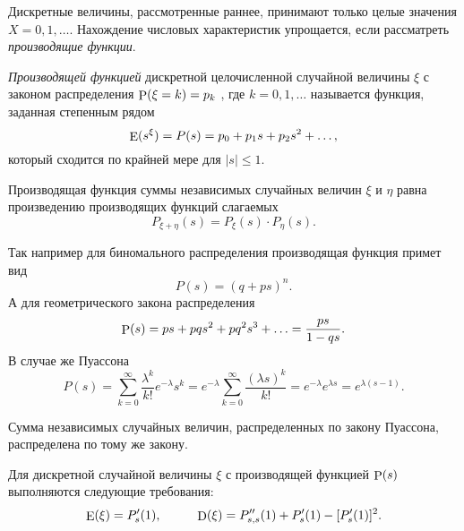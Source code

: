 Дискретные величины, рассмотренные раннее, принимают только целые значения $X = 0, 1, \ldots$. Нахождение числовых характеристик упрощается, если рассматреть \textit{производящие функции}.

\begin{to_def}
    \textit{Производящей функцией} дискретной целочисленной случайной величины $\xi$ с законом распределения
    $\P (\xi = k) = p_k$ , где $k = 0, 1, \ldots$ называется функция, заданная степенным рядом
    \begin{equation}
        \E(s^\xi) = P (s) = p_0 + p_1 s + p_2 s^2 + \ldots,
    \end{equation}
    который сходится по крайней мере для $|s| \leq 1$. 
\end{to_def}

\begin{to_thr}[]
    Производящая функция суммы независимых случайных величин $\xi$ и $\eta$ равна произведению производящих функций слагаемых
    \begin{equation}
        P_{\xi + \eta} (s) = P_\xi (s) \cdot P_\eta (s).
    \end{equation}
\end{to_thr}

Так например для биномального распределения производящая функция примет вид
\begin{equation*}
    P (s) = (q + ps)^n.
\end{equation*}
А для геометрического закона распределения
\begin{equation*}
    \P (s) = p s + p q s^2 + p q^2 s^3 + \ldots = \frac{ps}{1-qs}.
\end{equation*}
В случае же Пуассона
\begin{equation*}
    P (s) = \sum_{k=0}^{\infty} \frac{\lambda^k}{k!}e^{-\lambda} s^k = e^{-\lambda} \sum_{k=0}^\infty 
    \frac{(\lambda s)^k}{k!} = e^{-\lambda} e^{\lambda s} = e^{\lambda (s-1)}.
\end{equation*}

\begin{to_thr}
    Сумма независимых случайных величин, распределенных по закону Пуассона, распределена по тому же закону.
\end{to_thr}

\begin{to_thr}[]
    Для дискретной случайной величины $\xi$ с производящей функцией $\P (s)$ выполняются следующие требования:
    \begin{equation}
        \E (\xi) = P'_s (1),
        \hspace{10 mm}
        \D (\xi) = P''_{s,s} (1) + P'_s (1) - [P'_{s} (1)]^2.
    \end{equation}
\end{to_thr}



